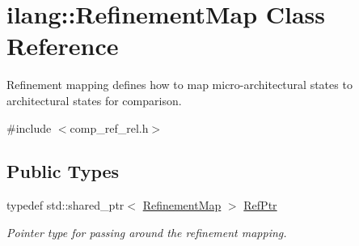 \hypertarget{classilang_1_1_refinement_map}{}\section{ilang\+:\+:Refinement\+Map Class Reference}
\label{classilang_1_1_refinement_map}


Refinement mapping defines how to map micro-\/architectural states to architectural states for comparison.  




{\ttfamily \#include $<$comp\+\_\+ref\+\_\+rel.\+h$>$}

\subsection*{Public Types}
\begin{DoxyCompactItemize}
\item 
\mbox{\label{classilang_1_1_refinement_map_ab988c650cef076c777dd0200e8dab51f}} 
typedef std\+::shared\+\_\+ptr$<$ \mbox{\hyperlink{classilang_1_1_refinement_map}{Refinement\+Map}} $>$ \mbox{\hyperlink{classilang_1_1_refinement_map_ab988c650cef076c777dd0200e8dab51f}{Ref\+Ptr}}
\begin{DoxyCompactList}\small\item\em Pointer type for passing around the refinement mapping. \end{DoxyCompactList}\end{DoxyCompactItemize}
